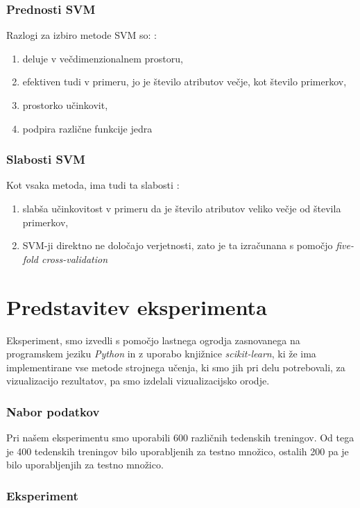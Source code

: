 \documentclass{acm_proc_article-sp}
\begin{document}
\subsubsection{Prednosti SVM}
Razlogi za izbiro metode SVM so: \cite{SciDev}:
\begin{enumerate}
\item{deluje v večdimenzionalnem prostoru,}
\item{efektiven tudi v primeru, jo je število atributov večje, kot število primerkov,}
\item{prostorko učinkovit,}
\item{podpira različne funkcije jedra}
\end{enumerate}

\subsubsection{Slabosti SVM}
Kot vsaka metoda, ima tudi ta slabosti \cite{SciDev}:
\begin{enumerate}
\item{slabša učinkovitost v primeru da je število atributov veliko večje od števila primerkov,}
\item{SVM-ji direktno ne določajo verjetnosti, zato je ta izračunana s pomočjo \textit{five-fold cross-validation}}
\end{enumerate}


\section{Predstavitev eksperimenta}
Eksperiment, smo izvedli s pomočjo lastnega ogrodja zasnovanega na programskem jeziku \textit{Python} in z uporabo knjižnice \textit{scikit-learn}, ki že ima implementirane vse metode strojnega učenja, ki smo jih pri delu potrebovali, za vizualizacijo rezultatov, pa smo izdelali vizualizacijsko orodje. 


\subsubsection{Nabor podatkov}
Pri našem eksperimentu smo uporabili 600 različnih tedenskih treningov.
Od tega je 400 tedenskih treningov bilo uporabljenih za testno množico, ostalih 200 pa je bilo uporabljenjih za testno množico.

\subsubsection{Eksperiment}
\end{document}
